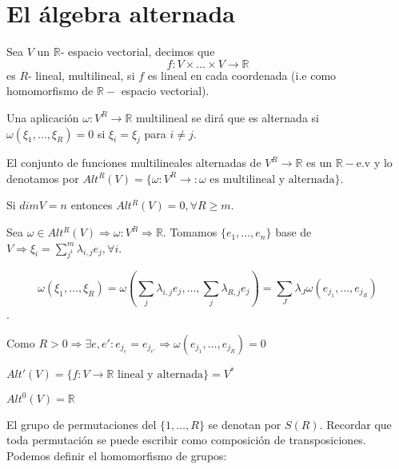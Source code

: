 \chapter{El álgebra alternada}

\begin{Def}
Sea $V$ un $\mathbb{R}$- espacio vectorial, decimos que 
$$f:V \times \dots \times V \rightarrow \mathbb{R}$$
es $R$- lineal, multilineal, si $f$ es lineal en cada coordenada (i.e como homomorfismo de $\mathbb{R}-$ espacio vectorial).
\end{Def}

\begin{Def}
Una aplicación $\omega :V^R\rightarrow \mathbb{R}$ multilineal se dirá que es alternada si $\omega (\xi_1,\dots , \xi_R)=0$ si $ \xi_i=\xi_j$ para $i\neq j$. 
\end{Def}

\begin{Def}
El conjunto de funciones multilineales alternadas de $V^R \rightarrow \mathbb{R}$ es un $\mathbb{R}-$e.v y lo denotamos por $Alt^R(V)=\{ \omega: V^R\rightarrow : \omega \text{ es multilineal y alternada} \}$. 
\end{Def}

\begin{Cor}
Si $dim V=n$ entonces $Alt^R(V)=0, \forall R \ge m$. 
\end{Cor}

\begin{Dem}
Sea $\omega \in Alt^R(V)\Rightarrow \omega: V^R \Rightarrow \mathbb{R}$. Tomamos $\{e_1,\dots , e_n\}$ base de $V \Rightarrow \xi_i=\sum_{j^1}^m \lambda_{i,j}e_j, \forall i$.

$$\omega (\xi_1,\dots , \xi_R)=\omega (\sum_j \lambda_{i,j}e_j,\dots , \sum_j\lambda_{R,j}e_j)=\sum_J \lambda_J \omega (e_{j_1},\dots ,e_{j_R})$$.

Como $R > 0 \Rightarrow \exists e,e': e_{j_e}=e_{j_{e'}} \Rightarrow \omega(e_{j_1},\dots, e_{j_R})=0 $
\end{Dem}

\begin{nota}
\begin{itemize*}
\item $Alt'(V)=\{ f:V\rightarrow \mathbb{R} \text{ lineal y alternada} \}=V^*$
\item $Alt^0(V)=\mathbb{R}$
\end{itemize*}
\end{nota}

El grupo de permutaciones del $\{ 1,\dots, R \}$ se denotan por $S(R)$. Recordar que toda permutación se puede escribir como composición de transposiciones. Podemos definir el homomorfismo de grupos:

